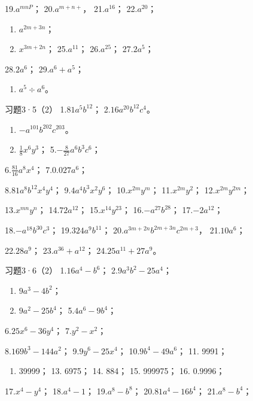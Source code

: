 19.\(a^{mnP}\)； 20.\(a^{m+n+}\)， 21.\(a^{16}\)； 22.\(a^{20}\)；
\begin{enumerate}[start=23]
\item
  \(a^{2m+3n}\)；
\item
  \(x^{3m + 2n}\)； 25.\(a^{11}\)； 26.\(a^{25}\)； 27.\(2a^5\)；
\end{enumerate}
28.\(2a^6\)； 29.\(a^6 + a^5\)；

\begin{enumerate}[start=30]
\item
  \(a^5 \div a^6\)。
\end{enumerate}

习题3·5（2） 1.\(81a^{5}b^{12}\)； 2.\(16a^{20}b^{12}c^{4}\)。
\begin{enumerate}[start=3]
\item
  \(-a^{101}b^{202}c^{203}\)。
\item
  \(\frac{1}{8} x^{6}y^{3}\)； 5.\(-\frac{8}{27} a^{6}b^{3}c^{6}\)；
\end{enumerate}
6.\(\frac{81}{16} a^{8}x^{4}\)； 7.\(0.027a^{6}\)；

8.\(81a^{8}b^{12}x^{4}y^{4}\)； 9.\(4a^{4}b^{3}x^{2}y^{6}\)；
10.\(x^{2m}y^{m}\)； 11.\(x^{2m}y^{2}\)； 12.\(x^{2m}y^{2m}\)；

13.\(x^{mn}y^n\)； 14.\(72a^{12}\)； 15.\(x^{14}y^{23}\)；
16.\(-a^{27}b^{28}\)； 17.\(-2a^{12}\)；

18.\(-a^{18}b^{30}c^{3}\)； 19.\(324a^{9}b^{11}\)；
20.\(a^{3m+2n}b^{2m+3n}c^{2m+3}\)， 21.\(10a^{6}\)；

22.\(28a^{9}\)； 23.\(a^{36} + a^{12}\)； 24.\(25a^{11} + 27a^{9}\)。

习题3·6（2） 1.\(16a^{4} - b^{6}\)； 2.\(9a^{3}b^{2} - 25a^{4}\)；
\begin{enumerate}[start=3]
\item
  \(9a^{3} - 4b^{2}\)；
\item
  \(9a^{2} - 25b^{4}\)； 5.\(4a^{6} - 9b^{4}\)；
\end{enumerate}
6.\(25x^{6} - 36y^{4}\)； 7.\(y^{2} - x^{2}\)；

8.\(169b^{3} - 144a^{2}\)； 9.\(9y^{6} - 25x^{4}\)；
10.\(9b^{4} - 49a^{6}\)； 11. 9991；

\begin{enumerate}[start=12]
\item
  39999； 13. 6975； 14. 884； 15. 999975； 16. 0.9996；
\end{enumerate}

17.\(x^{4} - y^{4}\)； 18.\(a^4 - 1\)； 19.\(a^8 - b^8\)；
20.\(81a^4 - 16b^4\)； 21.\(a^8 - b^4\)；

